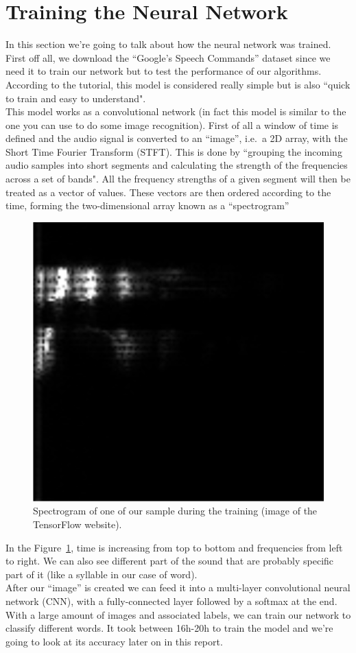 \documentclass[11pt,a4paper,titlepage]{report}
\begin{document}
\section{Training the Neural Network}
\label{sec:training}
\hspace*{0.6cm}
In this section we're going to talk about how the neural network was trained. First off all, we download the ``Google's Speech Commands''\cite{TensorFlow} dataset since we need it to train our network but to test the performance of our algorithms. According to the tutorial, this model is considered really simple but is also ``quick to train and easy to understand".\\
\hspace*{0.6cm}
This model works as a convolutional network (in fact this model is similar to the one you can use to do some image recognition). First of all a window of time is defined and the audio signal is converted to an ``image'', i.e.\ a 2D array, with the Short Time Fourier Transform (STFT). This is done by ``grouping the incoming audio samples into short segments and calculating the strength of the frequencies across a set of bands". All the frequency strengths of a given segment will then be treated as a vector of values. These vectors are then ordered according to the time, forming the two-dimensional array known as a ``spectrogram''\\
\begin{figure}[h]
	\centering
	\includegraphics[width=0.7\linewidth]{Rapport2}
	\caption{Spectrogram of one of our sample during the training (image of the TensorFlow website).}
	\label{fig:spec}
\end{figure}

\hspace*{0.6cm}
In the Figure~\ref{fig:spec}, time is increasing from top to bottom and frequencies from left to right. We can also see different part of the sound that are probably specific part of it (like a syllable in our case of word).\\
\hspace*{0.6cm}
After our ``image'' is created we can feed it into a multi-layer convolutional neural network (CNN), with a fully-connected layer followed by a softmax at the end. With a large amount of images and associated labels, we can train our network to classify different words. It took between 16h-20h to train the model and we're going to look at its accuracy later on in this report.
\end{document}
